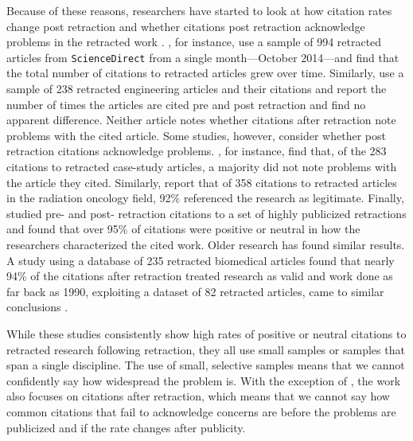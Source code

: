 \documentclass[12pt, letterpaper]{article}
\begin{document}
Because of these reasons, researchers have started to look at how citation rates change post retraction \citep{bar2018temporal, rubbo2019citation} and whether citations post retraction acknowledge problems in the retracted work \citep[e.g.,][]{bar2017post, hamilton2019continued, luwel2018schon}. \citet{bar2018temporal}, for instance, use a sample of 994 retracted articles from \texttt{ScienceDirect} from a single month---October 2014---and find that the total number of citations to retracted articles grew over time. Similarly, \citet{rubbo2019citation} use a sample of 238 retracted engineering articles and their citations and report the number of times the articles are cited pre and post retraction and find no apparent difference. Neither article notes whether citations after retraction note problems with the cited article. Some studies, however, consider whether post retraction citations acknowledge problems. \citet{bar2017post}, for instance, find that, of the 283 citations to retracted case-study articles, a majority did not note problems with the article they cited. Similarly, \citet{hamilton2019continued} report that of 358 citations to retracted articles in the radiation oncology field, 92\% referenced the research as legitimate. Finally, \citet{luwel2018schon} studied pre- and post- retraction citations to a set of highly publicized retractions and found that over 95\% of citations were positive or neutral in how the researchers characterized the cited work. Older research has found similar results. A study using a database of 235 retracted biomedical articles found that nearly 94\% of the citations after retraction treated research as valid \citep{budd1998phenomena} and work done as far back as 1990, exploiting a dataset of 82 retracted articles, came to similar conclusions \citep{pfeifer1990continued}.

While these studies consistently show high rates of positive or neutral citations to retracted research following retraction, they all use small samples or samples that span a single discipline. The use of small, selective samples means that we cannot confidently say how widespread the problem is. With the exception of \citet{luwel2018schon}, the work also focuses on citations after retraction, which means that we cannot say how common citations that fail to acknowledge concerns are before the problems are publicized and if the rate changes after publicity.
\end{document}
